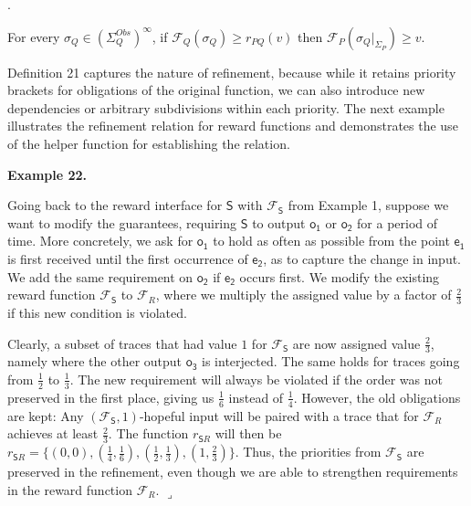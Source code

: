 \documentclass[10pt,a4paper]{article}
\begin{document}
 
 
\par{}. 
 
For every $\sigma_{Q}\in(\Sigma_{Q}^{Obs})^{\infty}$, if $\mathcal{F}_{Q}(\sigma_{Q})\geq r_{PQ}(v)$ then $\mathcal{F}_{P}(\sigma_{Q}|_{\Sigma_{P}})\geq v$.\par
 
 
  
 
 
 
Definition 21 captures the nature of refinement, because while it retains priority brackets for obligations of the original function, we can also introduce new dependencies or arbitrary subdivisions within each priority. The next example illustrates the refinement relation for reward functions and demonstrates the use of the helper function for establishing the relation.\par
 
 
 
\par\medskip\noindent\textbf{Example 22.}\par
 
 
Going back to the reward interface for $\mathsf{S}$ with $\mathcal{F}_{\mathsf{S}}$ from Example 1, suppose we want to modify the guarantees, requiring $\mathsf{S}$ to output $\mathsf{o_{1}}$ or $\mathsf{o_{2}}$ for a period of time. More concretely, we ask for $\mathsf{o_{1}}$ to hold as often as possible from the point $\mathsf{e_{1}}$ is first received until the first occurrence of $\mathsf{e_{2}}$, as to capture the change in input. We add the same requirement on $\mathsf{o_{2}}$ if $\mathsf{e_{2}}$ occurs first. We modify the existing reward function $\mathcal{F}_{\mathsf{S}}$ to $\mathcal{F}_{R}$, where we multiply the assigned value by a factor of $\frac{2}{3}$ if this new condition is violated.\par
 
 
 
Clearly, a subset of traces that had value $1$ for $\mathcal{F}_{\mathsf{S}}$ are now assigned value $\frac{2}{3}$, namely where the other output $\mathsf{o_{3}}$ is interjected. The same holds for traces going from $\frac{1}{2}$ to $\frac{1}{3}$. The new requirement will always be violated if the order was not preserved in the first place, giving us $\frac{1}{6}$ instead of $\frac{1}{4}$. However, the old obligations are kept: Any $(\mathcal{F}_{\mathsf{S}},1)$-hopeful input will be paired with a trace that for $\mathcal{F}_{R}$ achieves at least $\frac{2}{3}$. The function $r_{\mathsf{S}R}$ will then be $r_{\mathsf{S}R}=\{(0,0),(\frac{1}{4},\frac{1}{6}),(\frac{1}{2},\frac{1}{3}),(1,\frac{2}{3})\}$. Thus, the priorities from $\mathcal{F}_{\mathsf{S}}$ are preserved in the refinement, even though we are able to strengthen requirements in the reward function $\mathcal{F}_{R}$. $\lrcorner$\par
 
\end{document}
